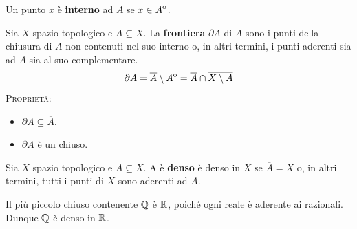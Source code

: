 \begin{define}
	Un punto $x$ è \textbf{interno} ad $A$ se $x\in{\kern0ptA}^{\mathrm{o}}$.
\end{define}
\begin{define}
Sia $X$ spazio topologico e $A\subseteq X$. La \textbf{frontiera} $\partial A$ di $A$ sono i punti della chiusura di $A$ non contenuti nel suo interno o, in altri termini, i punti aderenti sia ad $A$ sia al suo complementare.
\begin{equation}
\partial A=\overline{A}\setminus {\kern0ptA}^{\mathrm{o}}=\overline{A}\cap\overline{X\setminus A}
\end{equation}
\textsc{Proprietà:}
\begin{itemize}
	\item $\partial{A}\subseteq \overline{A}$.
	\item $\partial{A}$ è un chiuso.
\end{itemize}
\end{define}
\begin{define}
Sia $X$ spazio topologico e $A\subseteq X$. A è \textbf{denso} è denso in $X$ se $\overline{A}=X$ o, in altri termini, tutti i punti di $X$ sono aderenti ad $A$.
\end{define}
\begin{example}
Il più piccolo chiuso contenente $\mathbb{Q}$ è $\mathbb{R}$, poiché ogni reale è aderente ai razionali. Dunque $\mathbb{Q}$ è denso in $\mathbb{R}$.
\end{example}

